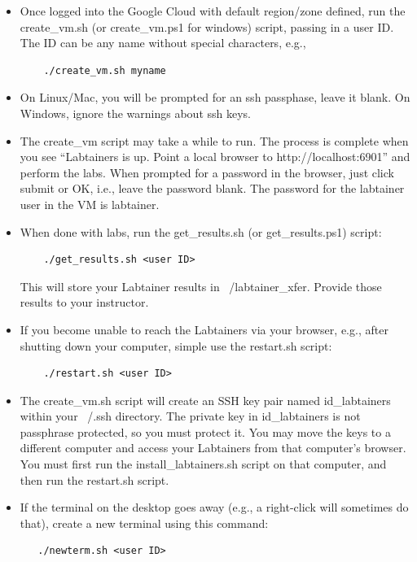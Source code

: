\documentclass[12pt]{article}
\begin{document}
\begin{itemize}
\item Once logged into the Google Cloud with default region/zone defined, run the create\_vm.sh (or create\_vm.ps1 for windows) script, passing in a user ID.
The ID can be any name without special characters, e.g.,
\begin{verbatim}
    ./create_vm.sh myname
\end{verbatim}

\item On Linux/Mac, you will be prompted for an ssh passphase, leave it blank.  On Windows, ignore the warnings
about ssh keys.

\item The create\_vm script may take a while to run.  The process is complete when you see “Labtainers is up.  
Point a local browser to http://localhost:6901” and perform the labs.
When prompted for a password in the browser, just click submit or OK, i.e., leave the password blank.
The password for the labtainer user in the VM is labtainer.  

\item When done with labs, run the get\_results.sh (or get\_results.ps1) script: 
\begin{verbatim}
    ./get_results.sh <user ID>
\end{verbatim}
\noindent This will store your Labtainer results in ~/labtainer\_xfer.  Provide those
results to your instructor.

\item If you become unable to reach the Labtainers via your browser, e.g., after 
shutting down your computer, simple use the restart.sh script:
\begin{verbatim}
    ./restart.sh <user ID>
\end{verbatim}

\item The create\_vm.sh script will create an SSH key pair named id\_labtainers within your ~/.ssh directory.
The private key in id\_labtainers is not passphrase protected, so you must protect it.
You may move the keys to a different computer and access your Labtainers from that computer's
browser.  You must first run the install\_labtainers.sh script on that computer, and then run
the restart.sh script.

\item If the terminal on the desktop goes away (e.g., a right-click will sometimes do that), create a new
terminal using this command:
\begin{verbatim}
   ./newterm.sh <user ID>
\end{verbatim}


\end{itemize}
\end{document}

